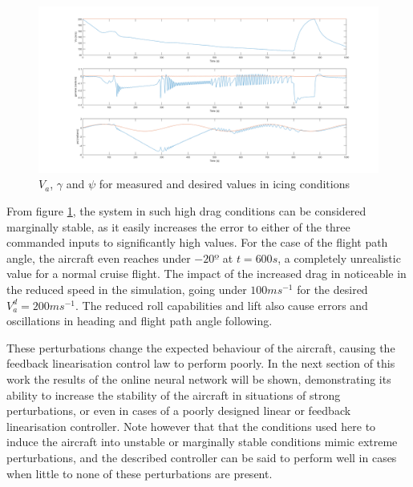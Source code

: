 \begin{figure}[H]
\centering
\includegraphics[width=1\textwidth]{Figures/Results/ref_icing.PNG}
\caption[Reference following in icing conditions]{$V_a$, $\gamma$ and $\psi$ for measured and desired values in icing conditions}
\label{fig:ref_icing}
\end{figure}

From figure \ref{fig:ref_icing}, the system in such high drag conditions can be considered marginally stable, as it easily increases the error to either of the three commanded inputs to significantly high values. For the case of the flight path angle, the aircraft even reaches under $-20º$ at $t=600s$, a completely unrealistic value for a normal cruise flight. The impact of the increased drag in noticeable in the reduced speed in the simulation, going under $100ms^{-1}$ for the desired $V_a^d=200ms^{-1}$. The reduced roll capabilities and lift also cause errors and oscillations in heading and flight path angle following.



These perturbations change the expected behaviour of the aircraft, causing the feedback linearisation control law to perform poorly. In the next section of this work the results of the online neural network will be shown, demonstrating its ability to increase the stability of the aircraft in situations of strong perturbations, or even in cases of a poorly designed linear or feedback linearisation controller. Note however that that the conditions used here to induce the aircraft into unstable or marginally stable conditions mimic extreme perturbations, and the described controller can be said to perform well in cases when little to none of these perturbations are present.



